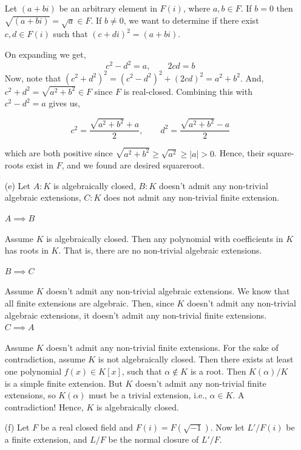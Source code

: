 \documentclass[12pt]{article}
\begin{document}
\begin{solution}
\begin{enumerate}
        Let $(a + bi)$ be an arbitrary element in $F(i)$, where $a,b \in F$. If $b = 0$ then $\sqrt{(a + bi)} = \sqrt a \in F$. If $b \neq 0$, we want to determine if there exist $c, d \in F(i)$ such that $(c+di)^2 = (a+bi)$. 
        
        On expanding we get, 
        \[c^2  - d^2  = a, \qquad  2cd  = b\]
        Now, note that $(c^2 + d^2)^2 = (c^2 - d^2)^2 + (2cd)^2 = a^2 + b^2$. And, $c^2 + d^2  = \sqrt{a^2 + b^2} \in F$ since $F$ is real-closed. Combining this with $c^2 - d^2 = a$ gives us, 

        \[c^2 = \frac{\sqrt{a^2+b^2} + a}{2}, \qquad d^2 = \frac{\sqrt{a^2+b^2} - a}{2}\]

        which are both positive since $\sqrt{a^2 + b^2} \geq \sqrt{a^2} \geq |a| > 0$. Hence, their square-roots exist in $F$, and we found are desired squareroot. 

        \item [(e)] Let $A: K$ is algebraically closed, $B: K$ doesn't admit any non-trivial algebraic extensions, $C: K$ does not admit any non-trivial finite extension. 
        

        $A \implies B$ 

        Assume $K$ is algebraically closed. Then any polynomial with coefficients in $K$ has roots in $K$. That is, there are no non-trivial algebraic extensions. 

        \bbni 
        $B \implies C$ 

        Assume $K$ doesn't admit any non-trivial algebraic extensions. We know that all finite extensions are algebraic. Then, since $K$ doesn't admit any non-trivial algebraic extensions, it doesn't admit any non-trivial finite extensions. 
        \bbni
        $C \implies A$ 

        Assume $K$ doesn't admit any non-trivial finite extensions. For the sake of contradiction, assume $K$ is not algebraically closed. Then there exists at least one polynomial $f(x) \in K[x]$, such that $\alpha \notin K$ is a root. Then $K(\alpha)/K$ is a simple finite extension. But $K$ doesn't admit any non-trivial finite extensions, so $K(\alpha)$ must be a trivial extension, i.e., $\alpha \in K$. A contradiction! Hence, $K$ is algebraically closed. 
        
        \item [(f)] Let $F$ be a real closed field and $F(i) = F(\sqrt{-1})$. Now let $L'/F(i)$ be a finite extension, and $L/F$ be the normal closure of $L'/F$. 
        

\end{enumerate}
\end{solution}
\end{document}
